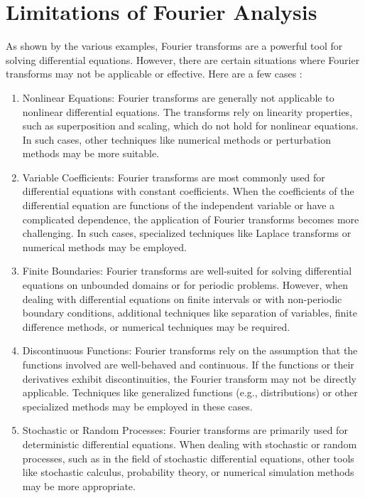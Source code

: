 \section{Limitations of Fourier Analysis}
As shown by the various examples, Fourier transforms are a powerful tool for solving differential equations. However, there are certain situations where Fourier transforms may not be applicable or effective. Here are a few cases \citep{howell2016principles}:

\begin{enumerate}
    \item Nonlinear Equations: Fourier transforms are generally not applicable to nonlinear differential equations. The transforms rely on linearity properties, such as superposition and scaling, which do not hold for nonlinear equations. In such cases, other techniques like numerical methods or perturbation methods may be more suitable.
    \item Variable Coefficients: Fourier transforms are most commonly used for differential equations with constant coefficients. When the coefficients of the differential equation are functions of the independent variable or have a complicated dependence, the application of Fourier transforms becomes more challenging. In such cases, specialized techniques like Laplace transforms or numerical methods may be employed.
    \item Finite Boundaries: Fourier transforms are well-suited for solving differential equations on unbounded domains or for periodic problems. However, when dealing with differential equations on finite intervals or with non-periodic boundary conditions, additional techniques like separation of variables, finite difference methods, or numerical techniques may be required.
    \item Discontinuous Functions: Fourier transforms rely on the assumption that the functions involved are well-behaved and continuous. If the functions or their derivatives exhibit discontinuities, the Fourier transform may not be directly applicable. Techniques like generalized functions (e.g., distributions) or other specialized methods may be employed in these cases.
    \item Stochastic or Random Processes: Fourier transforms are primarily used for deterministic differential equations. When dealing with stochastic or random processes, such as in the field of stochastic differential equations, other tools like stochastic calculus, probability theory, or numerical simulation methods may be more appropriate.
\end{enumerate}